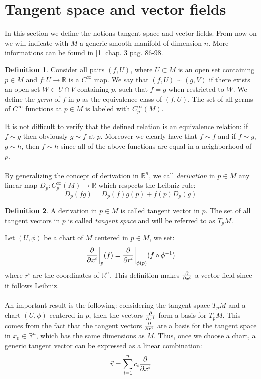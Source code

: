 \documentclass[12pt,a4paper]{report}
\theoremstyle{definition}
\newtheorem{Def}{Definition}[chapter]
\theoremstyle{Theorem}
\theoremstyle{definition}
\theoremstyle{definition}
\begin{document}
	\section{Tangent space and vector fields}\label{Sec_1.3}
	In this section we define the notions tangent space and vector fields. From now on we will indicate with $M$ a generic smooth manifold of dimension $n$. More informations can be found in [1] chap. 3 pag. 86-98.
	\begin{Def}
		Consider all pairs $(f,U)$, where $U\subset M$ is an open set containing $p\in M$ and $f:U\rightarrow \mathbb{R}$ is a $C^\infty$ map. We say that $(f,U)\sim(g,V)$ if there exists an open set $W\subset U\cap V$ containing $p$, such that $f=g$ when restricted to $W$. We define the \textit{germ} of $f$ in $p$ as the equivalence class of $(f,U)$.
		The set of all germs of $C^\infty$ functions at $p\in M$ is labeled with $C^\infty_p(M)$.
	\end{Def}
	It is not difficult to verify that the defined relation is an equivalence relation: if $f\sim g$ then obviously $g\sim f$ at $p$. Moreover we clearly have that $f\sim f$ and if $f\sim g$, $g\sim h$, then $f\sim h$ since all of the above functions are equal in a neighborhood of $p$.\\
	\\
	By generalizing the concept of derivation in $\mathbb{R}^n$, we call \textit{derivation} in $p\in M$ any linear map $D_p:C^\infty_p(M)\rightarrow\mathbb{R}$ which respects the Leibniz rule:
	$$D_p(fg)=D_p(f)g(p)+f(p)D_p(g)$$
	\begin{Def}
		A derivation in $p\in M$ is called tangent vector in $p$. The set of all tangent vectors in $p$ is called \textit{tangent space} and will be referred to as $T_pM$.
	\end{Def} 
	Let $(U,\phi)$ be a chart of $M$ centered in $p\in M$, we set:
	$${\partial\over \partial x^i}\bigg\rvert_p(f)={\partial\over \partial r^i}\bigg\rvert_{\phi(p)}(f\circ \phi^{-1})$$ where $r^i$ are the coordinates of $\mathbb{R}^n$. This definition makes ${\partial\over \partial x^i}$ a vector field since it follows Leibniz.\\
	\\
	An important result is the following: considering the tangent space $T_pM$ and a chart $(U,\phi)$ centered in $p$, then the vectors $\partial\over \partial x^i$ form a basis for $T_pM$. This comes from the fact that the tangent vectors $\partial\over \partial r^i$ are a basis for the tangent space in $x_0\in\mathbb{R}^n$, which has the same dimensions as $M$. Thus, once we choose a chart, a generic tangent vector can be expressed as a linear combination: $$\vec{v}=\sum_{i=1}^{n}c_i{\partial\over \partial x^i}$$ 
\end{document}
